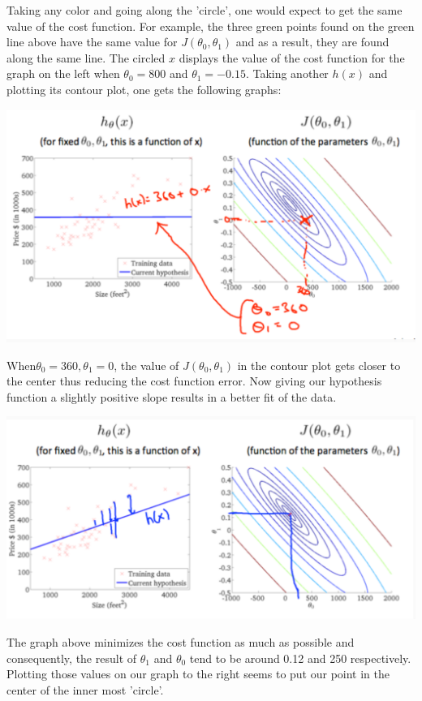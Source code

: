 \documentclass[10pt,a4paper,UTF8]{article}
\begin{document}
Taking any color and going along the 'circle', one would expect to get the same value of the cost function. For example, the three green points found on the green line above have the same value for \(J(\theta_{0},\theta_{1})\) and as a result, they are found along the same line. The circled \(x\) displays the value of the cost function for the graph on the left when \(\theta_{0}=800\) and \(\theta_{1} = -0.15\). Taking another \(h(x)\) and plotting its contour plot, one gets the following graphs:

\begin{center}
\includegraphics[width=.9\linewidth]{../../img/computer_ng/20171005costFunctionof2p2.png}
\end{center}

When\(\theta_{0} = 360,\theta_{1}=0\), the value of \(J(\theta_{0},\theta_{1})\)  in the contour plot gets closer to the center thus reducing the cost function error. Now giving our hypothesis function a slightly positive slope results in a better fit of the data.

\begin{center}
\includegraphics[width=.9\linewidth]{../../img/computer_ng/20171005costFunctionof2p3.png}
\end{center}

The graph above minimizes the cost function as much as possible and consequently, the result of \(\theta_{1}\) and \(\theta_{0}\) tend to be around 0.12 and 250 respectively. Plotting those values on our graph to the right seems to put our point in the center of the inner most 'circle'.
\end{document}
